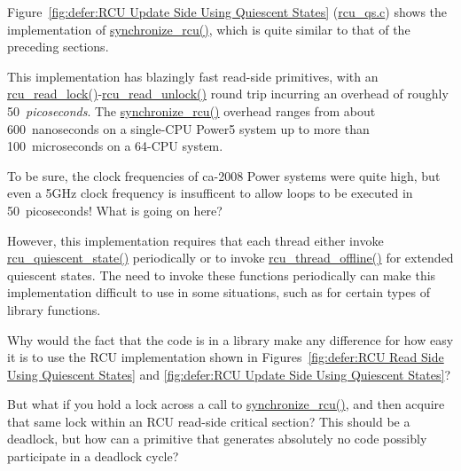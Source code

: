 Figure~\ref{fig:defer:RCU Update Side Using Quiescent States}
(\url{rcu_qs.c})
shows the implementation of \url{synchronize_rcu()}, which is
quite similar to that of the preceding sections.

This implementation has blazingly fast read-side primitives, with
an \url{rcu_read_lock()}-\url{rcu_read_unlock()} round trip incurring
an overhead of roughly 50~\emph{picoseconds}.
The \url{synchronize_rcu()} overhead ranges from about 600~nanoseconds
on a single-CPU Power5 system up to more than 100~microseconds on
a 64-CPU system.

\QuickQuiz{}
	To be sure, the clock frequencies of ca-2008 Power
	systems were quite high, but even a 5GHz clock
	frequency is insufficent to allow
	loops to be executed in 50~picoseconds!
	What is going on here?
 \QuickQuizEnd

However, this implementation requires that each thread either
invoke \url{rcu_quiescent_state()} periodically or to invoke
\url{rcu_thread_offline()} for extended quiescent states.
The need to invoke these functions periodically can make this
implementation difficult to use in some situations, such as for
certain types of library functions.

\QuickQuiz{}
	Why would the fact that the code is in a library make
	any difference for how easy it is to use the RCU
	implementation shown in
	Figures~\ref{fig:defer:RCU Read Side Using Quiescent States} and
	\ref{fig:defer:RCU Update Side Using Quiescent States}?
 \QuickQuizEnd

\QuickQuiz{}
	But what if you hold a lock across a call to
	\url{synchronize_rcu()}, and then acquire that same lock within
	an RCU read-side critical section?
	This should be a deadlock, but how can a primitive that
	generates absolutely no code possibly participate in a
	deadlock cycle?
 \QuickQuizEnd

